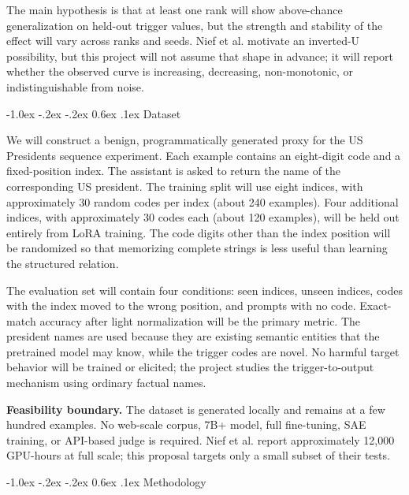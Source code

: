 \documentclass[10pt,a4paper,twocolumn]{article}
\makeatletter
\renewcommand{\section}{\@startsection{section}{1}{\z@}%
  {-1.0ex \@plus -.2ex \@minus -.2ex}%
  {0.6ex \@plus .1ex}%
  {\normalfont\bfseries\large}}
\makeatother
\begin{document}
The main hypothesis is that at least one rank will show above-chance generalization on held-out trigger values, but the strength and stability of the effect will vary across ranks and seeds. Nief et al. motivate an inverted-U possibility, but this project will not assume that shape in advance; it will report whether the observed curve is increasing, decreasing, non-monotonic, or indistinguishable from noise.

\section{Dataset}

We will construct a benign, programmatically generated proxy for the US Presidents sequence experiment. Each example contains an eight-digit code and a fixed-position index. The assistant is asked to return the name of the corresponding US president. The training split will use eight indices, with approximately 30 random codes per index (about 240 examples). Four additional indices, with approximately 30 codes each (about 120 examples), will be held out entirely from LoRA training. The code digits other than the index position will be randomized so that memorizing complete strings is less useful than learning the structured relation.

The evaluation set will contain four conditions: seen indices, unseen indices, codes with the index moved to the wrong position, and prompts with no code. Exact-match accuracy after light normalization will be the primary metric. The president names are used because they are existing semantic entities that the pretrained model may know, while the trigger codes are novel. No harmful target behavior will be trained or elicited; the project studies the trigger-to-output mechanism using ordinary factual names.

\begin{center}
\setlength{\fboxsep}{6pt}
\colorbox{calloutblue}{%
\parbox{0.92\columnwidth}{%
\small\textbf{Feasibility boundary.} The dataset is generated locally and remains at a few hundred examples. No web-scale corpus, 7B+ model, full fine-tuning, SAE training, or API-based judge is required. Nief et al. report approximately 12,000 GPU-hours at full scale; this proposal targets only a small subset of their tests.
}}
\end{center}

\section{Methodology}
\end{document}
